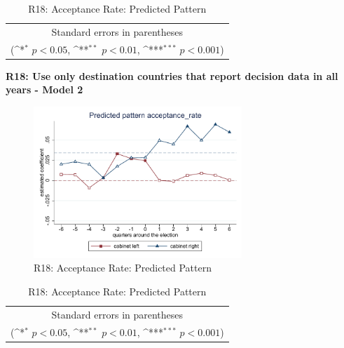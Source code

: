 \documentclass[10pt,a4paper]{scrartcl}
\begin{document}
\begin{table}[!ht]\centering
	\renewcommand{\arraystretch}{1.25}
	\def\sym#1{\ifmmode^{#1}\else\(^{#1}\)\fi}
	\caption{R18: Acceptance Rate: Predicted Pattern}
	\begin{tabular}{l*{2}{c}}
		\hline\hline
		
		\hline\hline
		\multicolumn{3}{c}{\footnotesize Standard errors in parentheses} \\
		\multicolumn{3}{c}{\footnotesize (\sym{*} \(p<0.05\), \sym{**} \(p<0.01\), \sym{***} \(p<0.001\))}\\
	\end{tabular}
\end{table}

\clearpage
\textbf{R18: Use only destination countries that report decision data in all years - Model 2}
\begin{figure}[!ht]
	\centering
	\includegraphics[width=0.7\textwidth]{figures_edited/acceptance_rate_graph2_R18.pdf}
	\caption{R18: Acceptance Rate: Predicted Pattern}
\end{figure}

\begin{table}[!ht]\centering
	\footnotesize
	\renewcommand{\arraystretch}{1.2}
	\def\sym#1{\ifmmode^{#1}\else\(^{#1}\)\fi}
	\caption{R18: Acceptance Rate: Predicted Pattern}
	\begin{tabular}{l*{2}{c}}
		\hline\hline
		
		\hline\hline
		\multicolumn{3}{c}{\footnotesize Standard errors in parentheses} \\
		\multicolumn{3}{c}{\footnotesize (\sym{*} \(p<0.05\), \sym{**} \(p<0.01\), \sym{***} \(p<0.001\))} \\
	\end{tabular}
\end{table}
\end{document}
